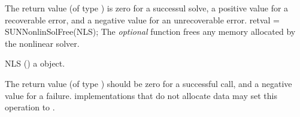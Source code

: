 {
  The return value  (of type ) is zero for a
  successul solve, a positive value for a recoverable error, and a
  negative value for an unrecoverable error.
}
{}
{
  retval = SUNNonlinSolFree(NLS);
}
{
  The \textit{optional} function  frees any
  memory allocated by the nonlinear solver.
}
{
  \begin{args}[NLS]
  \item[NLS] ()
    a {\sunnonlinsol} object.
  \end{args}
}
{
  The return value  (of type ) should be zero for a
  successful call, and a negative value for a failure. {\sunnonlinsol}
  implementations that do not allocate data may set this operation
  to .
}
{}


